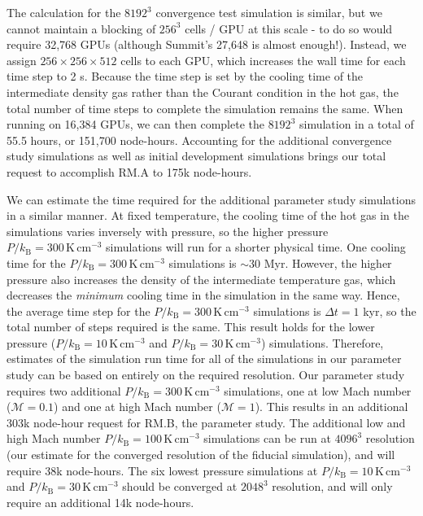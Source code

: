 \documentclass[11pt,letterpaper,english]{article}
\begin{document}
The calculation for the $8192^3$ convergence test simulation is similar, but we cannot maintain a blocking of $256^3$ cells / GPU at this scale - to do so would require 32,768 GPUs (although Summit's 27,648 is almost enough!). Instead, we assign $256\times256\times512$ cells to each GPU, which increases the wall time for each time step to 2 s. Because the time step is set by the cooling time of the intermediate density gas rather than the Courant condition in the hot gas, the total number of time steps to complete the simulation remains the same. When running on 16,384 GPUs, we can then complete the $8192^3$ simulation in a total of 55.5 hours, or 151,700 node-hours. Accounting for the additional convergence study simulations as well as initial development simulations brings our total request to accomplish RM.A to 175k node-hours.

We can estimate the time required for the additional parameter study simulations in a similar manner. At fixed temperature, the cooling time of the hot gas in the simulations varies inversely with pressure, so the higher pressure $P/k_\mathrm{B} = 300\,\mathrm{K}\,\mathrm{cm}^{-3}$ simulations will run for a shorter physical time. One cooling time for the $P/k_\mathrm{B} = 300\,\mathrm{K}\,\mathrm{cm}^{-3}$ simulations is $\sim 30$ Myr. However, the higher pressure also increases the density of the intermediate temperature gas, which decreases the {\it minimum} cooling time in the simulation in the same way. Hence, the average time step for the $P/k_\mathrm{B} = 300\,\mathrm{K}\,\mathrm{cm}^{-3}$ simulations is $\Delta t = 1$ kyr, so the total number of steps required is the same. This result holds for the lower pressure ($P/k_\mathrm{B} = 10\,\mathrm{K}\,\mathrm{cm}^{-3}$ and $P/k_\mathrm{B} = 30\,\mathrm{K}\,\mathrm{cm}^{-3}$) simulations. Therefore, estimates of the simulation run time for all of the simulations in our parameter study can be based on entirely on the required resolution. Our parameter study requires two additional $P/k_\mathrm{B} = 300\,\mathrm{K}\,\mathrm{cm}^{-3}$ simulations, one at low Mach number ($\mathcal{M} = 0.1$) and one at high Mach number ($\mathcal{M} = 1$). This results in an additional 303k node-hour request for RM.B, the parameter study. The additional low and high Mach number $P/k_\mathrm{B} = 100\,\mathrm{K}\,\mathrm{cm}^{-3}$ simulations can be run at $4096^3$ resolution (our estimate for the converged resolution of the fiducial simulation), and will require 38k node-hours. The six lowest pressure simulations at $P/k_\mathrm{B} = 10\,\mathrm{K}\,\mathrm{cm}^{-3}$ and $P/k_\mathrm{B} = 30\,\mathrm{K}\,\mathrm{cm}^{-3}$ should be converged at $2048^3$ resolution, and will only require an additional 14k node-hours.
\end{document}
